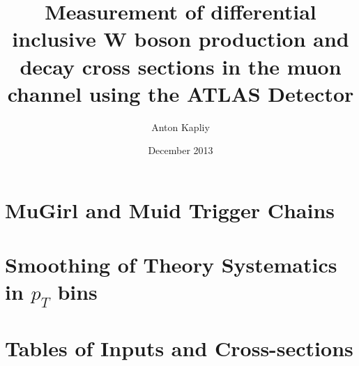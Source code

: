 \documentclass{ucetd}
\title{
Measurement of differential inclusive W boson production and decay cross sections in the muon channel using the ATLAS Detector
}
\author{Anton Kapliy}
\date{December 2013}
\begin{document}



\appendix

\chapter{MuGirl and Muid Trigger Chains}
\label{appendix:ac}


\chapter{Smoothing of Theory Systematics in $p_T$ bins}
\label{appendix:smoothing}


\chapter{Tables of Inputs and Cross-sections}
\label{appendix:results}



\makebibliography



%
%
\end{document}
